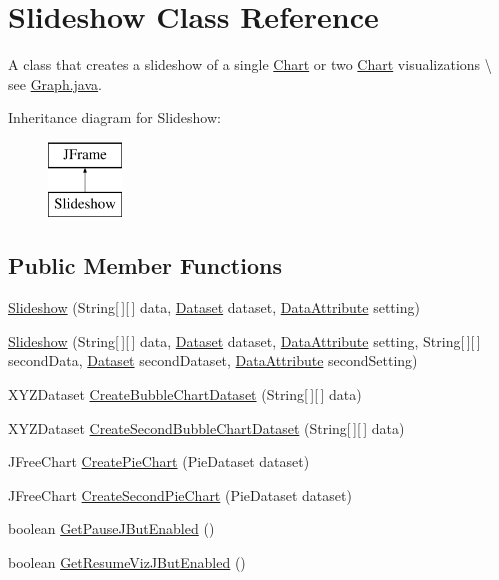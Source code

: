 \hypertarget{class_slideshow}{\section{Slideshow Class Reference}
\label{class_slideshow}
}


A class that creates a slideshow of a single \hyperlink{interface_chart}{Chart} or two \hyperlink{interface_chart}{Chart} visualizations \textbackslash{} see \hyperlink{_graph_8java}{Graph.\-java}.  


Inheritance diagram for Slideshow\-:\begin{figure}[H]
\begin{center}
\leavevmode
\includegraphics[height=2.000000cm]{class_slideshow}
\end{center}
\end{figure}
\subsection*{Public Member Functions}
\begin{DoxyCompactItemize}
\item 
\hyperlink{class_slideshow_a28bfdbb62ff04edbcf2a6ff4e8277b27}{Slideshow} (String\mbox{[}$\,$\mbox{]}\mbox{[}$\,$\mbox{]} data, \hyperlink{class_dataset}{Dataset} dataset, \hyperlink{class_data_attribute}{Data\-Attribute} setting)
\item 
\hyperlink{class_slideshow_a0fe21ea7ceb1b6a1574729c7cd48f263}{Slideshow} (String\mbox{[}$\,$\mbox{]}\mbox{[}$\,$\mbox{]} data, \hyperlink{class_dataset}{Dataset} dataset, \hyperlink{class_data_attribute}{Data\-Attribute} setting, String\mbox{[}$\,$\mbox{]}\mbox{[}$\,$\mbox{]} second\-Data, \hyperlink{class_dataset}{Dataset} second\-Dataset, \hyperlink{class_data_attribute}{Data\-Attribute} second\-Setting)
\item 
X\-Y\-Z\-Dataset \hyperlink{class_slideshow_a8eabfefadfab208b396dcfef42f052a1}{Create\-Bubble\-Chart\-Dataset} (String\mbox{[}$\,$\mbox{]}\mbox{[}$\,$\mbox{]} data)
\item 
X\-Y\-Z\-Dataset \hyperlink{class_slideshow_a5f490654d036fbc20f7d96acf7cb6d0a}{Create\-Second\-Bubble\-Chart\-Dataset} (String\mbox{[}$\,$\mbox{]}\mbox{[}$\,$\mbox{]} data)
\item 
J\-Free\-Chart \hyperlink{class_slideshow_ab4fdd0457bf5c09167538759056d4dc5}{Create\-Pie\-Chart} (Pie\-Dataset dataset)
\item 
J\-Free\-Chart \hyperlink{class_slideshow_a632f7d55c776bad2fcfa46e5b142fd67}{Create\-Second\-Pie\-Chart} (Pie\-Dataset dataset)
\item 
boolean \hyperlink{class_slideshow_aa6a1c8f9752646edcd00bde9e8b1bccf}{Get\-Pause\-J\-But\-Enabled} ()
\item 
boolean \hyperlink{class_slideshow_a64a069640e3a02812d71c946ba397aaf}{Get\-Resume\-Viz\-J\-But\-Enabled} ()
\end{DoxyCompactItemize}
